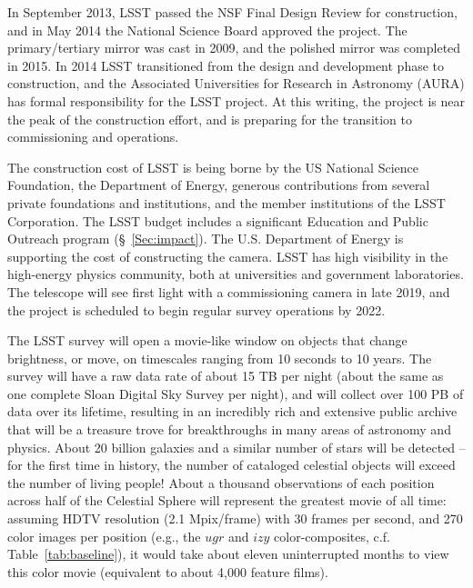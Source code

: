 In September 2013, LSST passed the NSF Final Design Review for construction,
and in May 2014 the National Science Board approved the project.
The primary/tertiary mirror was cast in 2009, and the polished mirror
was completed in 2015.
In 2014 LSST transitioned from the design and development phase to
construction, and the Associated Universities for Research in
Astronomy (AURA) has formal responsibility for the LSST project.  At
this writing,  the project is near the peak of the construction
effort, and is preparing for the transition to
commissioning and operations.

The construction cost of LSST is being borne by the US National Science
Foundation, the Department of Energy, generous contributions from several
private foundations and institutions, and the member institutions of the
LSST Corporation. The LSST budget includes a significant Education and
Public Outreach program (\S~\ref{Sec:impact}).
The U.S. Department of Energy is supporting the cost of constructing the
camera. LSST has high visibility in the high-energy physics community,
both at universities and government laboratories. The telescope will
see first light with a commissioning camera in late 2019, and the
project is scheduled to begin regular survey operations by 2022.

The LSST survey will open a movie-like window on objects that
change brightness, or move, on timescales ranging from 10 seconds to 10 years.
The survey will have a raw data rate of about 15 TB per night (about the same as one
complete Sloan Digital Sky Survey per night), and will collect over 100 PB
of data over its lifetime, resulting in an incredibly rich and extensive
public archive that will be a treasure trove for breakthroughs in many areas
of astronomy and physics. About 20 billion galaxies and a similar number of stars
will be detected -- for the first time in history, the number of cataloged
celestial objects will exceed the number of living people! About a thousand
observations of each position across half of the Celestial Sphere will
represent the greatest movie of all time: assuming HDTV resolution (2.1
Mpix/frame) with 30 frames per second, and 270 color images per position
(e.g., the $ugr$ and $izy$ color-composites, c.f. Table~\ref{tab:baseline}), it would take
about eleven uninterrupted months to view this color movie (equivalent
to about 4,000 feature films).


